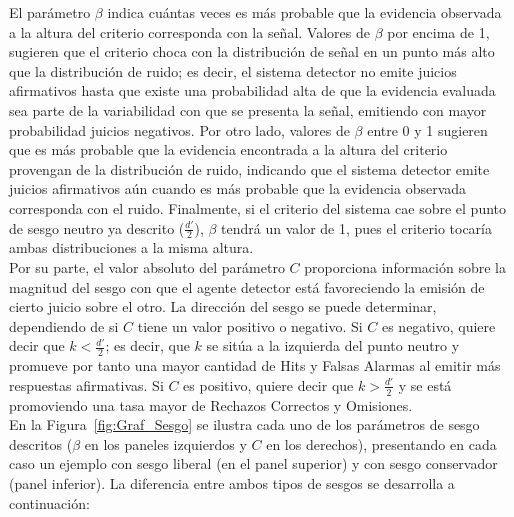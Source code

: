 \begin{itemize}
El parámetro $\beta$ indica cuántas veces es más probable que la evidencia observada a la altura del criterio corresponda con la señal. Valores de $\beta$ por encima de 1, sugieren que el criterio choca con la distribución de señal en un punto más alto que la distribución de ruido; es decir, el sistema detector no emite juicios afirmativos hasta que existe una probabilidad alta de que la evidencia evaluada sea parte de la variabilidad con que se presenta la señal, emitiendo con mayor probabilidad juicios negativos. Por otro lado, valores de $\beta$ entre 0 y 1 sugieren que es más probable que la evidencia encontrada a la altura del criterio provengan de la distribución de ruido, indicando que el sistema detector emite juicios afirmativos aún cuando es más probable que la evidencia observada corresponda con el ruido. Finalmente, si el criterio del sistema cae sobre el punto de sesgo neutro ya descrito ($\frac{d'}{2}$), $\beta$ tendrá un valor de 1, pues el criterio tocaría ambas distribuciones a la misma altura.\\

Por su parte, el valor absoluto del parámetro $C$ proporciona información sobre la magnitud del sesgo con que el agente detector está favoreciendo la emisión de cierto juicio sobre el otro. La dirección del sesgo se puede determinar, dependiendo de si $C$ tiene un valor positivo o negativo. Si $C$ es negativo, quiere decir que $k < \frac{d'}{2}$; es decir, que $k$ se sitúa a la izquierda del punto neutro y promueve por tanto una mayor cantidad de Hits y Falsas Alarmas al emitir más respuestas afirmativas. Si $C$ es positivo, quiere decir que $k > \frac{d'}{2}$ y se está promoviendo una tasa mayor de Rechazos Correctos y Omisiones.\\


En la Figura~\ref{fig:Graf_Sesgo} se ilustra cada uno de los parámetros de sesgo descritos ($\beta$ en los paneles izquierdos y $C$ en los derechos), presentando en cada caso un ejemplo con sesgo liberal (en el panel superior) y con sesgo conservador (panel inferior). La diferencia entre ambos tipos de sesgos se desarrolla a continuación:\\


\end{itemize}
